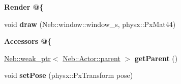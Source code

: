 \begin{Indent}{\bf \-Render @\{}\par
\begin{DoxyCompactItemize}
\item 
\hypertarget{classNeb_1_1Actor_1_1Base_a25f3c875b9fc5c1382f82a0bf8824fff}{void {\bfseries draw} (\-Neb\-::window\-::window\-\_\-s, physx\-::\-Px\-Mat44)}\label{classNeb_1_1Actor_1_1Base_a25f3c875b9fc5c1382f82a0bf8824fff}

\end{DoxyCompactItemize}
\end{Indent}
\begin{Indent}{\bf \-Accessors @\{}\par
\begin{DoxyCompactItemize}
\item 
\hypertarget{classNeb_1_1Actor_1_1Base_a27a90cb13c2a5036b175c19de0b20959}{\hyperlink{classNeb_1_1weak__ptr}{\-Neb\-::weak\-\_\-ptr}$<$ \hyperlink{classNeb_1_1Actor_1_1parent}{\-Neb\-::\-Actor\-::parent} $>$ {\bfseries get\-Parent} ()}\label{classNeb_1_1Actor_1_1Base_a27a90cb13c2a5036b175c19de0b20959}

\item 
\hypertarget{classNeb_1_1Actor_1_1Base_a98dd3ef316b4d28c5f36efa2d1e73966}{void {\bfseries set\-Pose} (physx\-::\-Px\-Transform pose)}\label{classNeb_1_1Actor_1_1Base_a98dd3ef316b4d28c5f36efa2d1e73966}

\end{DoxyCompactItemize}
\end{Indent}
